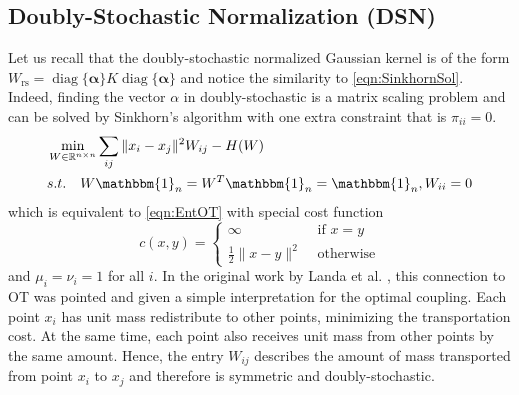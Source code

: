 \documentclass{article}
\newcommand{\R}{\mathbb{R}}
\newcommand{\half}{\frac{1}{2}}
\newcommand{\diag}[1]{\operatorname{diag}\{#1\}}
\newcommand{\red}[1]{\textcolor{red}{#1}}
\begin{document}
\subsection{Doubly-Stochastic Normalization (DSN) }\label{sec:DSN}


Let us recall that the doubly-stochastic normalized Gaussian kernel is of the form $W_{\text{rs}} = \diag{\mathbf{\alpha}} K \diag{\mathbf{\alpha}}$ and notice the similarity to \eqref{eqn:SinkhornSol}. 
Indeed, finding the vector $\alpha$ in doubly-stochastic is a matrix scaling problem and can be solved by Sinkhorn's algorithm with one extra constraint that is $\pi_{i i} = 0$.
\begin{align}\label{eqn:DoublyStochastic}
    & \min_{W\in\R^{n\times n}} \sum_{ij} \|x_i - x_j\|^2 W_{ij} - H(W) \\
    & s.t. \quad W \mathbbm{1}_{n}  = W^T \mathbbm{1}_{n} = \mathbbm{1}_{n} , W_{ii} = 0
\end{align}
which is equivalent to \eqref{eqn:EntOT} with special cost function
\begin{equation}\label{eqn:SpecialCost}
    c(x, y) = 
    \begin{cases}
    \infty &\text{ if } x = y\\
    \half\|x-y\|^2 &\text{ otherwise}
    \end{cases}
\end{equation}
and $\mu_i = \nu_i = 1$ for all $i.$
In the original work by Landa et al. \cite{landa2021doubly}, this connection to OT was pointed and given a simple interpretation for the optimal coupling. Each point $x_i$ has unit mass redistribute to other points, minimizing the transportation cost. 
At the same time, each point also receives unit mass from other points by the same amount.
Hence, the entry $W_{ij}$ describes the amount of mass transported from point $x_i$ to $x_j$ and therefore is symmetric and doubly-stochastic. 

\end{document}

